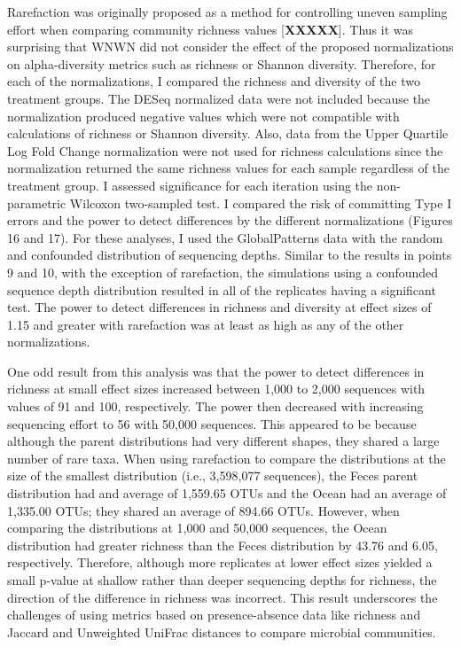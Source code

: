 \documentclass[
]{article}
\begin{document}
Rarefaction was originally proposed as a method for controlling uneven
sampling effort when comparing community richness values
{[}\textbf{XXXXX}{]}. Thus it was surprising that WNWN did not consider
the effect of the proposed normalizations on alpha-diversity metrics
such as richness or Shannon diversity. Therefore, for each of the
normalizations, I compared the richness and diversity of the two
treatment groups. The DESeq normalized data were not included because
the normalization produced negative values which were not compatible
with calculations of richness or Shannon diversity. Also, data from the
Upper Quartile Log Fold Change normalization were not used for richness
calculations since the normalization returned the same richness values
for each sample regardless of the treatment group. I assessed
significance for each iteration using the non-parametric Wilcoxon
two-sampled test. I compared the risk of committing Type I errors and
the power to detect differences by the different normalizations (Figures
16 and 17). For these analyses, I used the GlobalPatterns data with the
random and confounded distribution of sequencing depths. Similar to the
results in points 9 and 10, with the exception of rarefaction, the
simulations using a confounded sequence depth distribution resulted in
all of the replicates having a significant test. The power to detect
differences in richness and diversity at effect sizes of 1.15 and
greater with rarefaction was at least as high as any of the other
normalizations.

One odd result from this analysis was that the power to detect
differences in richness at small effect sizes increased between 1,000 to
2,000 sequences with values of 91 and 100, respectively. The power then
decreased with increasing sequencing effort to 56 with 50,000 sequences.
This appeared to be because although the parent distributions had very
different shapes, they shared a large number of rare taxa. When using
rarefaction to compare the distributions at the size of the smallest
distribution (i.e., 3,598,077 sequences), the Feces parent distribution
had and average of 1,559.65 OTUs and the Ocean had an average of
1,335.00 OTUs; they shared an average of 894.66 OTUs. However, when
comparing the distributions at 1,000 and 50,000 sequences, the Ocean
distribution had greater richness than the Feces distribution by 43.76
and 6.05, respectively. Therefore, although more replicates at lower
effect sizes yielded a small p-value at shallow rather than deeper
sequencing depths for richness, the direction of the difference in
richness was incorrect. This result underscores the challenges of using
metrics based on presence-absence data like richness and Jaccard and
Unweighted UniFrac distances to compare microbial communities.
\end{document}
